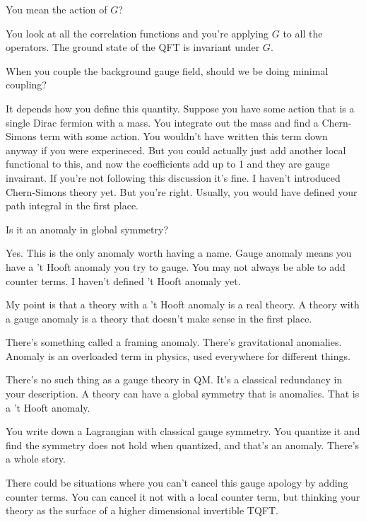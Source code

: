 \begin{question}
    You mean the action of $G$?
\end{question}
You look at all the correlation functions and you're applying $G$ to all the
operators.
The ground state of the QFT is invariant under $G$.

\begin{question}
    When you couple the background gauge field,
    should we be doing minimal coupling?
\end{question}
It depends how you define this quantity.
Suppose you have some action that is a single Dirac fermion with a mass.
You integrate out the mass
and find a Chern-Simons term with some action.
You wouldn't have written this term down anyway if you were experineced.
But you could actually just add another local functional to this,
and now the coefficients add up to 1 and they are gauge invairant.
If you're not following this discussion it's fine.
I haven't introduced Chern-Simons theory yet.
But you're right.
Usually, you would have defined your path integral in the first place.

\begin{question}
    Is it an anomaly in global symmetry?
\end{question}
Yes. This is the only anomaly worth having a name.
Gauge anomaly means you have a 't Hooft anomaly you try to gauge.
You may not always be able to add counter terms.
I haven't defined 't Hooft anomaly yet.

My point is that a theory with a 't Hooft anomaly is a real theory.
A theory with a gauge anomaly is a theory that doesn't make sense in the first
place.

There's something called a framing anomaly.
There's gravitational anomalies.
Anomaly is an overloaded term in physics,
used everywhere for different things.

There's no such thing as a gauge theory in QM.
It's a classical redundancy in your description.
A theory can have a global symmetry that is anomalies.
That is a 't Hooft anomaly.

You write down a Lagrangian with classical gauge symmetry.
You quantize it and find the symmetry does not hold when quantized,
and that's an anomaly.
There's a whole story.

There could be situations where you can't cancel this gauge apology by adding
counter terms.
You can cancel it not with a local counter term,
but thinking your theory as the surface of a higher dimensional invertible
TQFT.

